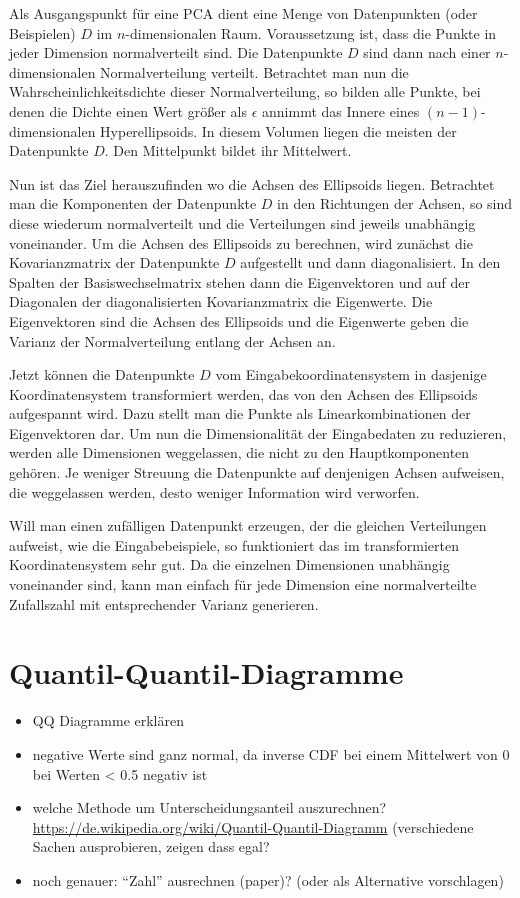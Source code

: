  Als Ausgangspunkt für eine PCA dient eine Menge von Datenpunkten (oder Beispielen) $D$ im $n$-dimensionalen Raum. Voraussetzung ist, dass die Punkte in jeder Dimension normalverteilt sind. 
 Die Datenpunkte $D$ sind dann nach einer $n$-dimensionalen Normalverteilung verteilt. Betrachtet man nun die Wahrscheinlichkeitsdichte dieser Normalverteilung, so bilden alle Punkte, bei denen die Dichte einen Wert größer als $\epsilon$ annimmt das Innere eines $(n-1)$-dimensionalen Hyperellipsoids. In diesem Volumen liegen die meisten der Datenpunkte $D$. Den Mittelpunkt bildet ihr Mittelwert.
 
 Nun ist das Ziel herauszufinden wo die Achsen des Ellipsoids liegen. Betrachtet man die Komponenten der Datenpunkte $D$ in den Richtungen der Achsen, so sind diese wiederum normalverteilt und die Verteilungen sind jeweils unabhängig voneinander.
 Um die Achsen des Ellipsoids zu berechnen, wird zunächst die Kovarianzmatrix der Datenpunkte $D$ aufgestellt und dann diagonalisiert. In den Spalten der Basiswechselmatrix stehen dann die Eigenvektoren und auf der Diagonalen der diagonalisierten Kovarianzmatrix die Eigenwerte.
 Die Eigenvektoren sind die Achsen des Ellipsoids und die Eigenwerte geben die Varianz der Normalverteilung entlang der Achsen an.
 
 Jetzt können die Datenpunkte $D$ vom Eingabekoordinatensystem in dasjenige Koordinatensystem transformiert werden, das von den Achsen des Ellipsoids aufgespannt wird. Dazu stellt man die Punkte als Linearkombinationen der Eigenvektoren dar. 
 Um nun die Dimensionalität der Eingabedaten zu reduzieren, werden alle Dimensionen weggelassen, die nicht zu den Hauptkomponenten gehören. Je weniger Streuung die Datenpunkte auf denjenigen Achsen aufweisen, die weggelassen werden, desto weniger Information wird verworfen.
 
 Will man einen zufälligen Datenpunkt erzeugen, der die gleichen Verteilungen aufweist, wie die Eingabebeispiele, so funktioniert das im transformierten Koordinatensystem sehr gut. Da die einzelnen Dimensionen unabhängig voneinander sind, kann man einfach für jede Dimension eine normalverteilte Zufallszahl mit entsprechender Varianz generieren.
 
 
\section{Quantil-Quantil-Diagramme} 
\label{qqdiagrams}

 \begin{itemize}
  \item QQ Diagramme erklären
  \item negative Werte sind ganz normal, da inverse CDF bei einem Mittelwert von 0 bei Werten < 0.5 negativ ist
  \item welche Methode um Unterscheidungsanteil auszurechnen? \url{https://de.wikipedia.org/wiki/Quantil-Quantil-Diagramm} (verschiedene Sachen ausprobieren, zeigen dass egal?
  \item noch genauer: "`Zahl"' ausrechnen (paper)? (oder als Alternative vorschlagen)
 \end{itemize}


